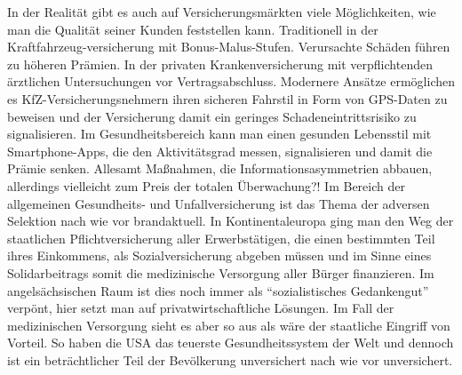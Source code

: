 In der Realität gibt es auch auf Versicherungsmärkten viele Möglichkeiten, wie man die Qualität seiner Kunden feststellen kann. Traditionell in der Kraftfahrzeug-versicherung mit Bonus-Malus-Stufen. Verursachte Schäden führen zu höheren Prämien. In der privaten Krankenversicherung mit verpflichtenden ärztlichen Untersuchungen vor Vertragsabschluss. Modernere Ansätze ermöglichen es KfZ-Versicherungsnehmern ihren sicheren Fahrstil in Form von GPS-Daten zu beweisen und der Versicherung damit ein geringes Schadeneintrittsrisiko zu signalisieren. Im Gesundheitsbereich kann man einen gesunden Lebensstil mit Smartphone-Apps, die den Aktivitätsgrad messen, signalisieren und damit die Prämie senken. Allesamt Maßnahmen, die Informationsasymmetrien abbauen, allerdings vielleicht zum Preis der totalen Überwachung?!  
Im Bereich der allgemeinen Gesundheits- und Unfallversicherung ist das Thema der adversen Selektion nach wie vor brandaktuell. In Kontinentaleuropa ging man den Weg der staatlichen Pflichtversicherung aller Erwerbstätigen, die einen bestimmten Teil ihres Einkommens, als Sozialversicherung abgeben müssen und im Sinne eines Solidarbeitrags somit die medizinische Versorgung aller Bürger finanzieren. Im angelsächsischen Raum ist dies noch immer als "`sozialistisches Gedankengut"' verpönt, hier setzt man auf privatwirtschaftliche Lösungen. Im Fall der medizinischen Versorgung sieht es aber so aus als wäre der staatliche Eingriff von Vorteil. So haben die USA das teuerste Gesundheitssystem der Welt und dennoch ist ein beträchtlicher Teil der Bevölkerung unversichert nach wie vor unversichert.

